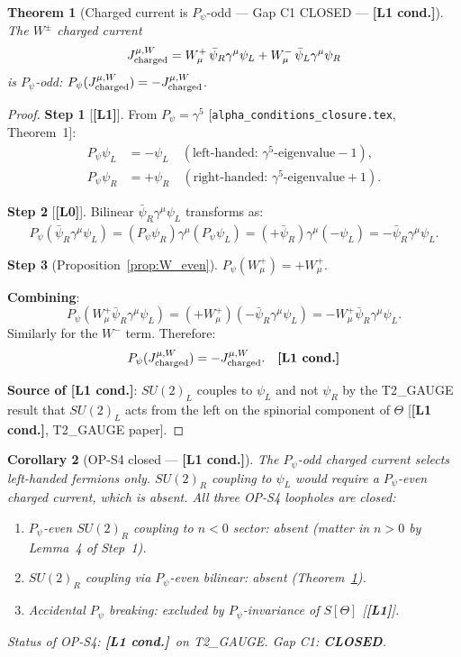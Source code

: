 \documentclass[12pt,a4paper]{article}
\newtheorem{theorem}{Theorem}[section]
\newtheorem{corollary}[theorem]{Corollary}
\theoremstyle{remark}\newtheorem{remark}[theorem]{Remark}
\newcommand{\Lz}{\textbf{[L0]}}
\newcommand{\Lo}{\textbf{[L1]}}
\newcommand{\Lc}{\textbf{[L1 cond.]}}
\begin{document}
\begin{theorem}[Charged current is $P_\psi$-odd — Gap C1 CLOSED — \Lc]
\label{thm:gap_c1}
The $W^\pm$ charged current
\[
  J^{\mu,W}_{\rm charged}
  = W^+_\mu\,\bar\psi_R\gamma^\mu\psi_L + W^-_\mu\,\bar\psi_L\gamma^\mu\psi_R
\]
is $P_\psi$-odd: $P_\psi(J^{\mu,W}_{\rm charged}) = -J^{\mu,W}_{\rm charged}$.
\end{theorem}

\begin{proof}
\textbf{Step 1} [\Lo]. From $P_\psi=\gamma^5$
[\texttt{alpha\_conditions\_closure.tex}, Theorem~1]:
\begin{align*}
  P_\psi\psi_L &= -\psi_L \quad (\text{left-handed: } \gamma^5\text{-eigenvalue} -1),\\
  P_\psi\psi_R &= +\psi_R \quad (\text{right-handed: } \gamma^5\text{-eigenvalue} +1).
\end{align*}

\textbf{Step 2} [\Lz]. Bilinear $\bar\psi_R\gamma^\mu\psi_L$ transforms as:
\[
  P_\psi(\bar\psi_R\gamma^\mu\psi_L)
  = \overline{(P_\psi\psi_R)}\gamma^\mu(P_\psi\psi_L)
  = (+\bar\psi_R)\gamma^\mu(-\psi_L)
  = -\bar\psi_R\gamma^\mu\psi_L.
\]

\textbf{Step 3} (Proposition~\ref{prop:W_even}). $P_\psi(W^+_\mu)=+W^+_\mu$.

\textbf{Combining}:
\[
  P_\psi(W^+_\mu\bar\psi_R\gamma^\mu\psi_L)
  = (+W^+_\mu)(-\bar\psi_R\gamma^\mu\psi_L)
  = -W^+_\mu\bar\psi_R\gamma^\mu\psi_L.
\]
Similarly for the $W^-$ term. Therefore:
\[
  P_\psi(J^{\mu,W}_{\rm charged}) = -J^{\mu,W}_{\rm charged}. \quad \Lc
\]

\textbf{Source of \Lc}: $SU(2)_L$ couples to $\psi_L$ and not $\psi_R$
by the T2\_GAUGE result that $SU(2)_L$ acts from the left on the
spinorial component of $\Theta$ [\Lc, T2\_GAUGE paper].
\end{proof}

\begin{corollary}[OP-S4 closed — \Lc]
The $P_\psi$-odd charged current selects left-handed fermions only.
$SU(2)_R$ coupling to $\psi_L$ would require a $P_\psi$-even charged current,
which is absent. All three OP-S4 loopholes are closed:
\begin{enumerate}
\item $P_\psi$-even $SU(2)_R$ coupling to $n<0$ sector: absent (matter in
  $n>0$ by Lemma~4 of Step~1).
\item $SU(2)_R$ coupling via $P_\psi$-even bilinear: absent
  (Theorem~\ref{thm:gap_c1}).
\item Accidental $P_\psi$ breaking: excluded by $P_\psi$-invariance of
  $S[\Theta]$ [\Lo].
\end{enumerate}
Status of OP-S4: \Lc\ on T2\_GAUGE. \qquad Gap C1: \textbf{CLOSED}.
\end{corollary}
\end{document}
